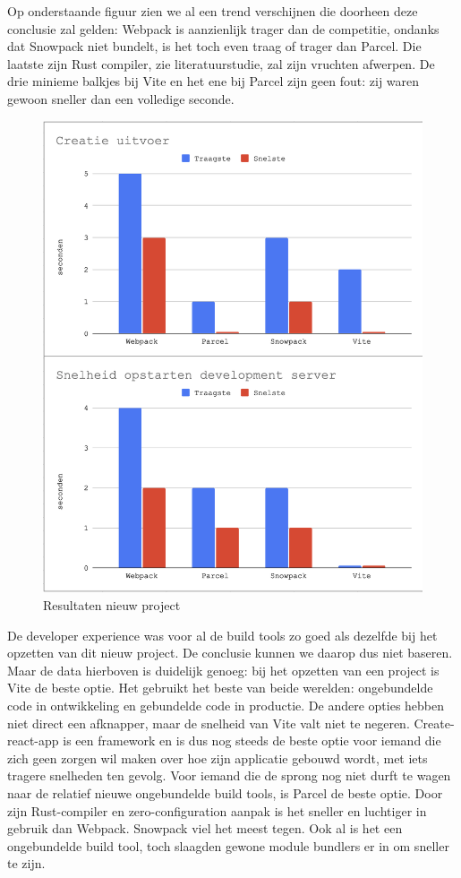 Op onderstaande figuur zien we al een trend verschijnen die doorheen deze conclusie zal gelden: Webpack is aanzienlijk trager dan de competitie, ondanks dat Snowpack niet bundelt, is het toch even traag of trager dan Parcel. Die laatste zijn Rust compiler, zie literatuurstudie, zal zijn vruchten afwerpen. De drie minieme balkjes bij Vite en het ene bij Parcel zijn geen fout: zij waren gewoon sneller dan een volledige seconde.

\begin{figure}[h]
   \includegraphics[scale=0.5]{conclusieNieuw}
       \centering
       \caption{Resultaten nieuw project}
   \end{figure}


De developer experience was voor al de build tools zo goed als dezelfde bij het opzetten van dit nieuw project. De conclusie kunnen we daarop dus niet baseren. Maar de data hierboven is duidelijk genoeg: bij het opzetten van een project is Vite de beste optie. Het gebruikt het beste van beide werelden: ongebundelde code in ontwikkeling en gebundelde code in productie. De andere opties hebben niet direct een afknapper, maar de snelheid van Vite valt niet te negeren. Create-react-app is een framework en is dus nog steeds de beste optie voor iemand die zich geen zorgen wil maken over hoe zijn applicatie gebouwd wordt, met iets tragere snelheden ten gevolg. Voor iemand die de sprong nog niet durft te wagen naar de relatief nieuwe ongebundelde build tools, is Parcel de beste optie. Door zijn Rust-compiler en zero-configuration aanpak is het sneller en luchtiger in gebruik dan Webpack. Snowpack viel het meest tegen. Ook al is het een ongebundelde build tool, toch slaagden gewone module bundlers er in om sneller te zijn. 
